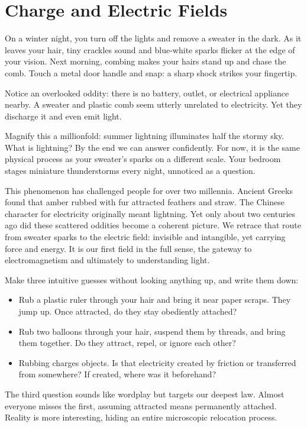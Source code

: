 \chapter{Charge and Electric Fields}


\begin{mainline}
On a winter night, you turn off the lights and remove a sweater in the dark. As it leaves your hair, tiny crackles sound and blue-white sparks flicker at the edge of your vision. Next morning, combing makes your hairs stand up and chase the comb. Touch a metal door handle and snap: a sharp shock strikes your fingertip.

Notice an overlooked oddity: there is no battery, outlet, or electrical appliance nearby. A sweater and plastic comb seem utterly unrelated to electricity. Yet they discharge it and even emit light.

Magnify this a millionfold: summer lightning illuminates half the stormy sky. What is lightning? By the end we can answer confidently. For now, it is the same physical process as your sweater's sparks on a different scale. Your bedroom stages miniature thunderstorms every night, unnoticed as a question.

This phenomenon has challenged people for over two millennia. Ancient Greeks found that amber rubbed with fur attracted feathers and straw. The Chinese character for electricity originally meant lightning. Yet only about two centuries ago did these scattered oddities become a coherent picture. We retrace that route from sweater sparks to the electric field: invisible and intangible, yet carrying force and energy. It is our first field in the full sense, the gateway to electromagnetism and ultimately to understanding light.
\end{mainline}


\begin{mainline}
Make three intuitive guesses without looking anything up, and write them down:

\begin{itemize}
  \item Rub a plastic ruler through your hair and bring it near paper scraps. They jump up. Once attracted, do they stay obediently attached?
  \item Rub two balloons through your hair, suspend them by threads, and bring them together. Do they attract, repel, or ignore each other?
  \item Rubbing charges objects. Is that electricity created by friction or transferred from somewhere? If created, where was it beforehand?
\end{itemize}

The third question sounds like wordplay but targets our deepest law. Almost everyone misses the first, assuming attracted means permanently attached. Reality is more interesting, hiding an entire microscopic relocation process.
\end{mainline}

